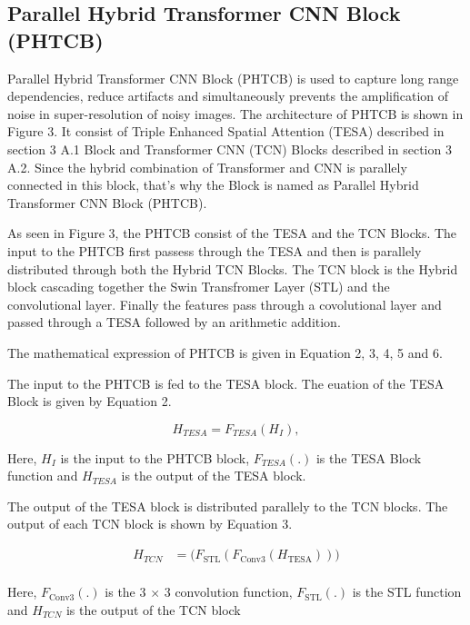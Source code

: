 \documentclass{ieeeaccess}
\begin{document}
\subsection{Parallel Hybrid Transformer CNN Block (PHTCB)}

Parallel Hybrid Transformer CNN Block (PHTCB) is used to capture long range dependencies, reduce artifacts and simultaneously prevents the amplification of noise in super-resolution of noisy images. The architecture of PHTCB is shown in Figure 3. It consist of Triple Enhanced Spatial Attention (TESA) described in section 3 A.1 Block and Transformer CNN (TCN) Blocks described in section 3 A.2. Since the hybrid combination of Transformer and CNN is parallely connected in this block, that's why the Block is named as Parallel Hybrid Transformer CNN Block (PHTCB). 

As seen in Figure 3, the PHTCB consist of the TESA and the TCN Blocks. The input to the PHTCB first passess through the TESA and then is parallely distributed through both the Hybrid TCN Blocks. The TCN block is the Hybrid block cascading together the Swin Transfromer Layer (STL) and the convolutional layer. Finally the features pass through a covolutional layer and passed through a TESA followed by an arithmetic addition.

The mathematical expression of PHTCB is given in Equation 2, 3, 4, 5 and 6.

The input to the PHTCB is fed to the TESA block. The euation of the TESA Block is given by Equation 2.

\begin{equation}
{H_{TESA}}= {F_{TESA}}({H_{I}}),
\end{equation}

Here, ${H_{I}}$ is the input to the PHTCB block,  ${F_{TESA}}$$(.)$ is the TESA Block function and ${H_{TESA}}$ is the output of the TESA block.

The output of the TESA block is distributed parallely to the TCN blocks. The output of each TCN block is shown by Equation 3.

\begin{equation}
\begin{aligned}
    {H_{TCN}} &= \bigl(F_{\text{STL}}(F_{\text{Conv3}}(H_{\text{TESA}}))\bigr) \\
\end{aligned}
\end{equation}

Here, ${F_{\text{Conv3}}}$$(.)$ is the 3 $\times$ 3 convolution function, ${F_{\text{STL}}}$$(.)$ is the STL function and ${H_{TCN}}$ is the output of the TCN block
\end{document}
